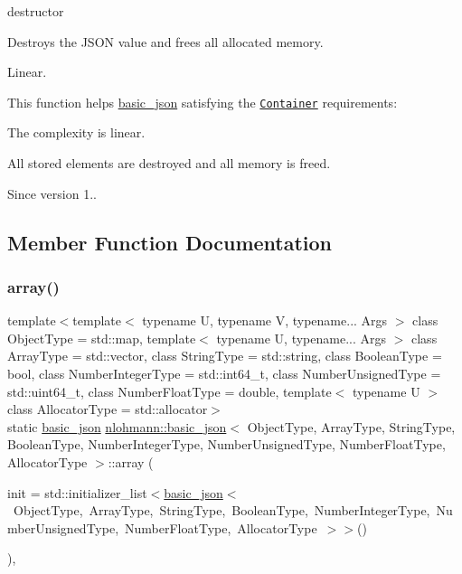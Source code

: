 destructor 

Destroys the J\+S\+ON value and frees all allocated memory.

Linear.

This function helps {\ttfamily \hyperlink{classnlohmann_1_1basic__json}{basic\+\_\+json}} satisfying the \href{http://en.cppreference.com/w/cpp/concept/Container}{\tt Container} requirements\+:
\begin{DoxyItemize}
\item The complexity is linear.
\item All stored elements are destroyed and all memory is freed.
\end{DoxyItemize}

\begin{DoxySince}{Since}
version 1.. 
\end{DoxySince}


\subsection{Member Function Documentation}
\hypertarget{classnlohmann_1_1basic__json_a5685815624b086caa532f41e853d4b0f}{}\label{classnlohmann_1_1basic__json_a5685815624b086caa532f41e853d4b0f} 
\subsubsection{\texorpdfstring{array()}{array()}}
{\footnotesize\ttfamily template$<$template$<$ typename U, typename V, typename... Args $>$ class Object\+Type = std\+::map, template$<$ typename U, typename... Args $>$ class Array\+Type = std\+::vector, class String\+Type  = std\+::string, class Boolean\+Type  = bool, class Number\+Integer\+Type  = std\+::int64\+\_\+t, class Number\+Unsigned\+Type  = std\+::uint64\+\_\+t, class Number\+Float\+Type  = double, template$<$ typename U $>$ class Allocator\+Type = std\+::allocator$>$ \\
static \hyperlink{classnlohmann_1_1basic__json}{basic\+\_\+json} \hyperlink{classnlohmann_1_1basic__json}{nlohmann\+::basic\+\_\+json}$<$ Object\+Type, Array\+Type, String\+Type, Boolean\+Type, Number\+Integer\+Type, Number\+Unsigned\+Type, Number\+Float\+Type, Allocator\+Type $>$\+::array (\begin{DoxyParamCaption}\item[{std\+::initializer\+\_\+list$<$ \hyperlink{classnlohmann_1_1basic__json}{basic\+\_\+json}$<$ Object\+Type, Array\+Type, String\+Type, Boolean\+Type, Number\+Integer\+Type, Number\+Unsigned\+Type, Number\+Float\+Type, Allocator\+Type $>$ $>$}]{init = {\ttfamily std\+:\+:initializer\+\_\+list$<$\hyperlink{classnlohmann_1_1basic__json}{basic\+\_\+json}$<$~ObjectType,~ArrayType,~StringType,~BooleanType,~NumberIntegerType,~NumberUnsignedType,~NumberFloatType,~AllocatorType~$>$$>$()} }\end{DoxyParamCaption})\hspace{0.3cm}{\ttfamily [inline]}, {\ttfamily [static]}}




